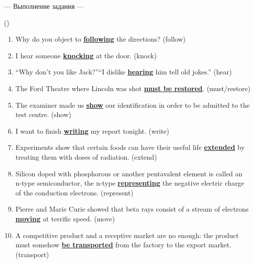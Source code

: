 \documentclass[main.tex]{subfiles}
\begin{document}
\newpage
{}

\hypertarget{ltask:2024-04-03-2}{--- Выполнение задания ---} (\hyperref[task:2024-04-03-2]{\color{blue}{перейти к тексту задания}})
\\

\vspace{5pt}
\begin{enumerate}[nosep, leftmargin=*]
	\itemsep\eitsp
	\item Why do you object to \uline{\textbf{following}} the directions? (follow)
	\item I hear someone \uline{\textbf{knocking}} at the door. (knock)
	\item ``Why don't you like Jack?''\newline ``I dislike \uline{\textbf{hearing}} him tell old jokes.'' (hear)
	\item The Ford Theatre where Lincoln was shot \uline{\textbf{must be restored}}. (must/restore)
	\item The examiner made us \uline{\textbf{show}} our identification in order to be admitted to the test centre. (show)
	\item I want to finish \uline{\textbf{writing}} my report tonight. (write)
	\item Experiments show that certain foods can have their useful life \uline{\textbf{extended}} by treating them with doses of radiation. (extend)
	\item Silicon doped with phosphorous or another pentavalent element is called an n-type semiconductor, the n-type \uline{\textbf{representing}} the negative electric charge of the conduction electrons. (represent)
	\item Pierre and Marie Curie showed that beta rays consist of a stream of electrons \uline{\textbf{moving}} at terrific speed. (move)
	\item A competitive product and a receptive market are no enough: the product must somehow \uline{\textbf{be transported}} from the factory to the export market. (transport)
\end{enumerate}
\end{document}
